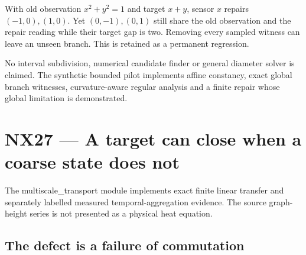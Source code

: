 \documentclass[
  11pt,
  a4paper,
]{report}
\begin{document}
With old observation \(x^2+y^2=1\) and target \(x+y\), sensor \(x\)
repairs \((-1,0),(1,0)\). Yet \((0,-1),(0,1)\) still share the old
observation and the repair reading while their target gap is two.
Removing every sampled witness can leave an unseen branch. This is
retained as a permanent regression.

No interval subdivision, numerical candidate finder or general diameter
solver is claimed. The synthetic bounded pilot implements affine
constancy, exact global branch witnesses, curvature-aware regular
analysis and a finite repair whose global limitation is demonstrated.

\hypertarget{nx27-a-target-can-close-when-a-coarse-state-does-not}{%
\chapter{NX27 --- A target can close when a coarse state does
not}\label{nx27-a-target-can-close-when-a-coarse-state-does-not}}

The multiscale\_transport module implements exact finite linear transfer
and separately labelled measured temporal-aggregation evidence. The
source graph-height series is not presented as a physical heat equation.

\hypertarget{the-defect-is-a-failure-of-commutation}{%
\section{The defect is a failure of
commutation}\label{the-defect-is-a-failure-of-commutation}}
\end{document}
